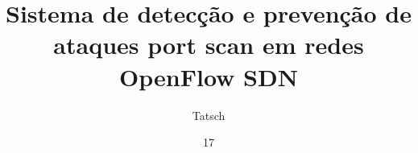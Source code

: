 \documentclass[tc]{unisc}
\title{Sistema de detecção e prevenção de ataques port scan em redes OpenFlow SDN}
\author{Tatsch}{Cássio Giordani}
\date{17}{novembro}{2017}
\begin{document}
\makecapa
\maketitle





%
%




\listoffigures
\listoftables



\tableofcontents












\end{document}
